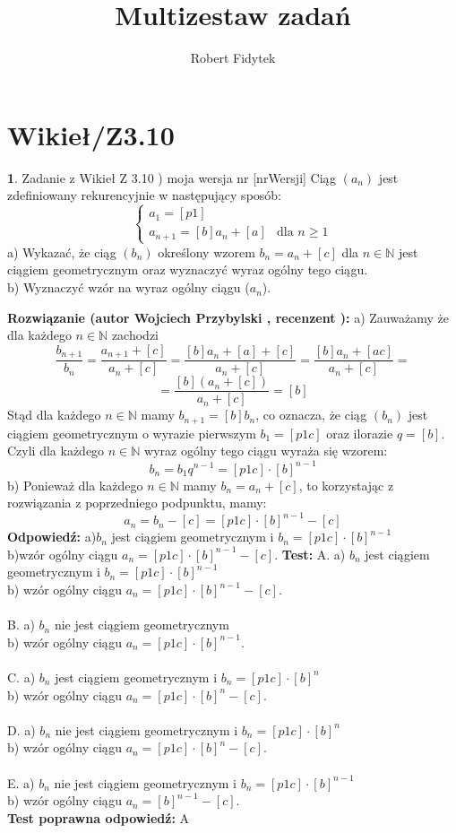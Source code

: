 \documentclass[12pt, a4paper]{article}
\title{Multizestaw zadań}
\author{Robert Fidytek}
\date{}
\theoremstyle{definition} %
\newtheorem{zad}{}
\newcommand{\kategoria}[1]{\section{#1}} %
\newcommand{\zadStart}[1]{\begin{zad}#1\newline} %
\newcommand{\zadStop}{\end{zad}}   %
\newcommand{\rozwStart}[2]{\noindent \textbf{Rozwiązanie (autor #1 , recenzent #2): }\newline} %
\newcommand{\rozwStop}{\newline}                                            %
\newcommand{\odpStart}{\noindent \textbf{Odpowiedź:}\newline}    %
\newcommand{\odpStop}{\newline}                                             %
\newcommand{\testStart}{\noindent \textbf{Test:}\newline} %
\newcommand{\testStop}{\newline} %
\newcommand{\kluczStart}{\noindent \textbf{Test poprawna odpowiedź:}\newline} %
\newcommand{\kluczStop}{\newline} %
\begin{document}
\maketitle


\kategoria{Wikieł/Z3.10}
\zadStart{Zadanie z Wikieł Z 3.10 ) moja wersja nr [nrWersji]}
Ciąg $(a_{n})$ jest zdefiniowany rekurencyjnie w następujący sposób:
$$
 \left\{ \begin{array}{ll}
a_{1}= [p1] & \\
a_{n+1}=[b]a_{n}+[a] & \mbox{dla }n\geq1
\end{array} \right.
$$
a) Wykazać, że ciąg $(b_{n})$ określony wzorem $b_{n}=a_{n}+[c]$ dla $n \in \mathbb{N}$ jest ciągiem geometrycznym oraz wyznaczyć wyraz ogólny tego ciągu.\\
b) Wyznaczyć wzór na wyraz ogólny ciągu ($a_{n}$).
\zadStop
\rozwStart{Wojciech Przybylski}{}
a) Zauważamy że dla każdego $n \in \mathbb{N}$ zachodzi
$$\frac{b_{n+1}}{b_{n}}=\frac{a_{n+1}+[c]}{a_{n}+[c]}=\frac{[b]a_{n}+[a]+[c]}{a_{n}+[c]}=\frac{[b]a_{n}+[ac]}{a_{n}+[c]}=$$
$$=\frac{[b](a_{n}+[c])}{a_{n}+[c]}=[b] $$
Stąd dla każdego $n \in \mathbb{N}$ mamy $b_{n+1}=[b]b_{n}$, co oznacza, że ciąg $(b_{n})$ jest ciągiem geometrycznym o wyrazie pierwszym $ b_{1}=[p1c]$ oraz ilorazie $q=[b]$.
 Czyli dla każdego $n \in \mathbb{N}$ wyraz ogólny tego ciągu wyraża się wzorem: 
$$ b_{n}=b_{1}q^{n-1}=[p1c]\cdot [b]^{n-1}$$ 
b) Ponieważ dla każdego $n \in \mathbb{N}$ mamy $b_{n}=a_{n}+[c]$, to korzystając z rozwiązania z poprzedniego podpunktu, mamy:
$$a_{n}=b_{n}-[c]=[p1c]\cdot[b]^{n-1}-[c]$$
\rozwStop
\odpStart
a)$b_{n}$ jest ciągiem geometrycznym i $b_{n}=[p1c]\cdot[b]^{n-1}$ \\
b)wzór ogólny ciągu $a_{n}=[p1c]\cdot[b]^{n-1}-[c]$.
\odpStop
\testStart
A. a) $b_{n}$ jest ciągiem geometrycznym i $b_{n}=[p1c]\cdot[b]^{n-1}$ \\
     b) wzór ogólny ciągu $a_{n}=[p1c]\cdot[b]^{n-1}-[c]$.\\
\\
B. a) $b_{n}$ nie jest ciągiem geometrycznym\\
     b) wzór ogólny ciągu $a_{n}=[p1c]\cdot[b]^{n-1}$.\\
\\
C. a) $b_{n}$ jest ciągiem geometrycznym i $b_{n}=[p1c]\cdot[b]^{n}$ \\
     b) wzór ogólny ciągu $a_{n}=[p1c]\cdot[b]^{n}-[c]$.\\
\\
D. a) $b_{n}$ nie jest ciągiem geometrycznym i $b_{n}=[p1c]\cdot[b]^{n}$ \\
     b) wzór ogólny ciągu $a_{n}=[p1c]\cdot[b]^{n}-[c]$.\\
\\
E. a) $b_{n}$ nie jest ciągiem geometrycznym i $b_{n}=[p1c]\cdot[b]^{n-1}$ \\
     b) wzór ogólny ciągu $a_{n}=[b]^{n-1}-[c]$.\\
\testStop
\kluczStart
A
\kluczStop
\end{document}
